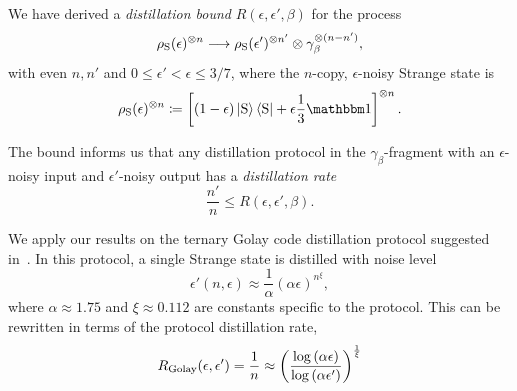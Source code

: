 \documentclass[pra,
aps,
twocolumn,
superscriptaddress,
groupedaddress,
nofootinbib,
reprint
]{revtex4-1}
\begin{document}
We have derived a \emph{distillation bound} $R(\epsilon, \epsilon', \beta)$ for the process
\begin{equation}\label{eq:stdist}
	\rho_{\rm{S}}(\epsilon)^{\otimes n} \longrightarrow \rho_{\rm{S}}(\epsilon')^{\otimes n'} \otimes \gamma_\beta^{\otimes (n-n')},
\end{equation}
with even $n, n'$ and $0 \leq \epsilon' < \epsilon \leq 3/7$, where the $n$-copy, $\epsilon$-noisy Strange state is
\begin{equation}\label{eq:test}
    \rho_{\rm{S}}(\epsilon)^{\otimes n} \coloneqq \left[ (1 - \epsilon) \ket{\rm{S}}\bra{\rm{S}} + \epsilon \frac{1}{3}\id \right]^{\otimes n}.
\end{equation}

The bound informs us that any distillation protocol in the $\gamma_\beta$-fragment with an $\epsilon$-noisy input and $\epsilon'$-noisy output has a \emph{distillation rate} 
\begin{equation}
	\frac{n'}{n} \leq R(\epsilon, \epsilon', \beta).
\end{equation}

We apply our results on the ternary Golay code distillation protocol suggested in~\cite{cit:prakash}.
In this protocol, a single Strange state is distilled with noise level
\begin{equation}
	\epsilon'(n, \epsilon) \approx \frac{1}{\alpha}(\alpha\epsilon)^{n^\xi},
\end{equation}
where $\alpha \approx 1.75$ and $\xi \approx 0.112$ are constants specific to the protocol.
This can be rewritten in terms of the protocol distillation rate,
\begin{equation}
	R_{\rm{Golay}}(\epsilon, \epsilon') = \frac{1}{n} \approx \left( \frac{\log{(\alpha \epsilon)}}{\log{(\alpha \epsilon')}} \right)^{\frac{1}{\xi}}
\end{equation}
\end{document}
